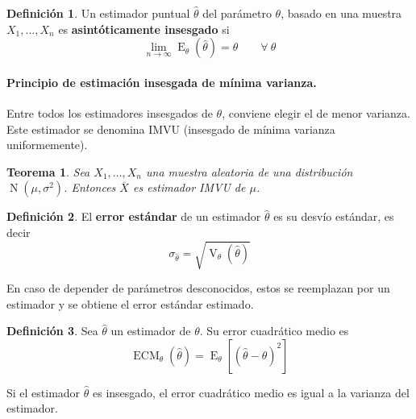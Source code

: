 \documentclass[11pt]{article}
\theoremstyle{plain}
\newtheorem*{teo}{Teorema}
\theoremstyle{definition}
\newtheorem*{defi}{Definición}
\theoremstyle{remark}
\newcommand{\deft}[1]{\textbf{#1}}  %
\newcommand{\esp}[0]{\ensuremath{\operatorname{E}}}  %
\newcommand{\var}[0]{\ensuremath{\operatorname{V}}}  %
\newcommand{\foralle}{\ensuremath{\forall \ }}  %
\newcommand{\dists}[1]{\ensuremath{\operatorname{#1}}}  %
\begin{document}
      \begin{defi}
        Un estimador puntual $\hat \theta$ del parámetro $\theta$, basado en una muestra $X_1, \dots, X_n$ es \deft{asintóticamente insesgado} si
        \[ \lim_{n \to \infty} \esp_\theta(\hat \theta) = \theta \qquad \foralle \theta \]
      \end{defi}

      \paragraph{Principio de estimación insesgada de mínima varianza.} Entre todos los estimadores insesgados de $\theta$, conviene elegir el de menor varianza. Este estimador se denomina IMVU (insesgado de mínima varianza uniformemente).

      \begin{teo}
        Sea $X_1, \dots, X_n$ una muestra aleatoria de una distribución $\dists{N}(\mu,\sigma^2)$. Entonces $\overline{X}$ es estimador IMVU de $\mu$.
      \end{teo}

      \begin{defi}
        El \deft{error estándar} de un estimador $\hat \theta$ es su desvío estándar, es decir
        \[ \sigma_{\hat \theta} = \sqrt{\var_\theta(\hat \theta)} \]

        En caso de depender de parámetros desconocidos, estos se reemplazan por un estimador y se obtiene el error estándar estimado.
      \end{defi}

      \begin{defi}
        Sea $\hat \theta$ un estimador de $\theta$. Su error cuadrático medio es
        \[ \operatorname{ECM}_\theta(\hat \theta) = \esp_\theta \left[ (\hat \theta - \theta)^2 \right] \]

        Si el estimador $\hat \theta$ es insesgado, el error cuadrático medio es igual a la varianza del estimador.
      \end{defi}
\end{document}
